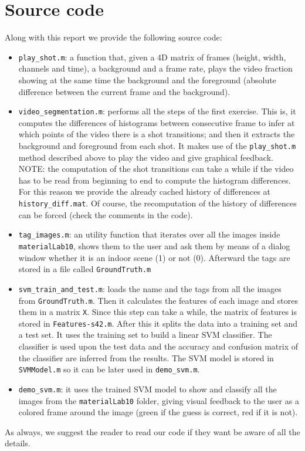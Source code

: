 \section{Source code}

Along with this report we provide the following source code:
\begin{itemize}
\item \texttt{play\_shot.m}: a function that, given a 4D matrix of frames (height, width, channels and time), a background and a frame rate, plays the video fraction showing at the same time the background and the foreground (absolute difference between the current frame and the background).
\item \texttt{video\_segmentation.m}: performs all the steps of the first exercise. This is, it computes the differences of histograms between consecutive frame to infer at which points of the video there is a shot transitions; and then it extracts the background and foreground from each shot. It makes use of the \texttt{play\_shot.m} method described above to play the video and give graphical feedback. NOTE: the computation of the shot transitions can take a while if the video has to be read from beginning to end to compute the histogram differences. For this reason we provide the already cached history of differences at \texttt{history\_diff.mat}. Of course, the recomputation of the history of differences can be forced (check the comments in the code).
\item \texttt{tag\_images.m}: an utility function that iterates over all the images inside \texttt{materialLab10}, shows them to the user and ask them by means of a dialog window whether it is an indoor scene (1) or not (0). Afterward the tags are stored in a file called \texttt{GroundTruth.m}
\item \texttt{svm\_train\_and\_test.m}: loads the name and the tags from all the images from \texttt{GroundTruth.m}. Then it calculates the features of each image and stores them in a matrix \texttt{X}. Since this step can take a while, the matrix of features is stored in \texttt{Features-s42.m}. After this it splits the data into a training set and a test set. It uses the training set to build a linear SVM classifier. The classifier is used upon the test data and the accuracy and confusion matrix of the classifier are inferred from the results. The SVM model is stored in \texttt{SVMModel.m} so it can be later used in \texttt{demo\_svm.m}.
\item \texttt{demo\_svm.m}: it uses the trained SVM model to show and classify all the images from the \texttt{materialLab10} folder, giving visual feedback to the user as a colored frame around the image (green if the guess is correct, red if it is not).
\end{itemize}

As always, we suggest the reader to read our code if they want be aware of all the details.